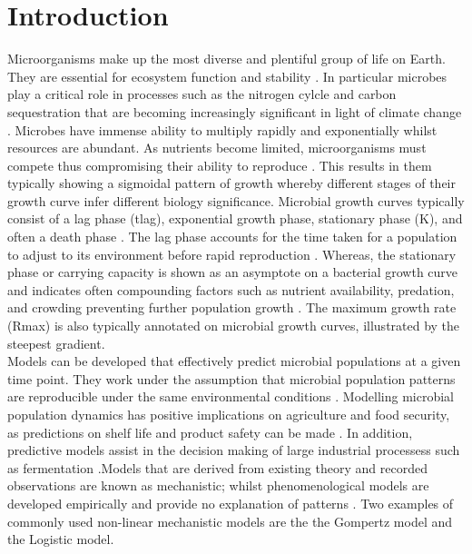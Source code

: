 \documentclass[11pt]{article}
\begin{document}
  \section{Introduction}
  \linenumbers
Microorganisms make up the most diverse and plentiful group of life on Earth. They are essential for ecosystem function and stability \cite{Shoemaker2021}. In particular microbes play a critical role in processes such as the nitrogen cylcle and carbon sequestration that are becoming increasingly significant in light of climate change \cite{Gupta2016}. Microbes have immense ability to multiply rapidly and exponentially whilst resources are abundant. As nutrients become limited, microorganisms must compete thus compromising their ability to reproduce \cite{NatRevMicro}. This results in them typically showing a sigmoidal pattern of growth whereby different stages of their growth curve infer different biology significance. Microbial growth curves typically consist of a lag phase (tlag), exponential growth phase, stationary phase (K), and often a death phase \cite{Zwietering1990}. The lag phase accounts for the time taken for a population to adjust to its environment before rapid reproduction \cite{BUCHANAN1997313}. Whereas, the stationary phase or carrying capacity is shown as an asymptote on a bacterial growth curve and indicates often compounding factors such as nutrient availability, predation, and crowding preventing further population growth \cite{WACHENHEIM2003157}. The maximum growth rate (Rmax) is also typically annotated on microbial growth curves, illustrated by the steepest gradient.\\
     
Models can be developed that effectively predict microbial populations at a given time point. They work under the assumption that microbial population patterns are reproducible under the same environmental conditions \cite{Pla2015}. Modelling microbial population dynamics has positive implications on agriculture and food security, as predictions on shelf life and product safety can be made \cite{Zwietering1990}. In addition, predictive models assist in the decision making of large industrial processess such as fermentation \cite{Garcia2021}.Models that are derived from existing theory and recorded observations are known as mechanistic; whilst phenomenological models are developed empirically and provide no explanation of patterns \cite{doi:10.1080/10408398.2011.570463}. Two examples of commonly used non-linear mechanistic models are the the Gompertz model and the Logistic model.\\
\end{document}
